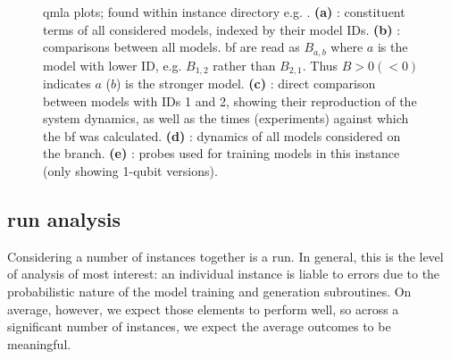 \begin{figure}[H]
    \begin{center}
        \qquad
        \qquad
        \qquad
        \qquad
    \end{center}
    \caption[Instance plots]{
        \gls{qmla} plots; found within instance directory e.g. . 
        \textbf{(a)} : constituent terms of all considered models, indexed by their model IDs.
        \textbf{(b)} :  comparisons between all models. 
        \gls{bf} are read as $B_{a,b}$ where $a$ is the model with lower ID, 
            e.g. $B_{1,2}$ rather than $B_{2,1}$. Thus $B > 0 (<0)$ indicates $a$ ($b$) is the stronger model.
        \textbf{(c)} : direct comparison between models with IDs 1 and 2, 
            showing their reproduction of the system dynamics, 
            as well as the times (experiments) against which the \gls{bf} was calculated. 
        \textbf{(d)} : dynamics of all models considered on the branch. 
        \textbf{(e)} : probes used for training models in this instance (only showing 1-qubit versions).
    }
    \label{fig:instance_plots}
\end{figure}

\subsection{\Gls{run} analysis}
Considering a number of \glspl{instance} together is a \gls{run}. 
In general, this is the level of analysis of most interest: 
    an individual instance is liable to errors due to the probabilistic nature of 
    the model training and generation subroutines. 
On average, however, we expect those elements to perform well, 
    so across a significant number of instances, we expect the average outcomes to be meaningful. 
\par 

